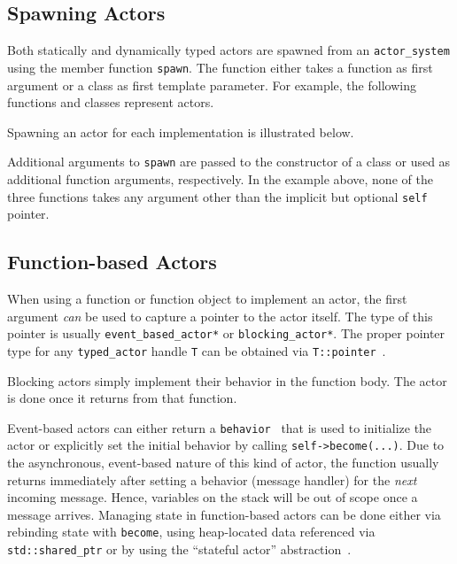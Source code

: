 \clearpage
\subsection{Spawning Actors}
\label{spawn}

Both statically and dynamically typed actors are spawned from an \lstinline^actor_system^ using the member function \lstinline^spawn^. The function either takes a function as first argument or a class as first template parameter. For example, the following functions and classes represent actors.



Spawning an actor for each implementation is illustrated below.



Additional arguments to \lstinline^spawn^ are passed to the constructor of a class or used as additional function arguments, respectively. In the example above, none of the three functions takes any argument other than the implicit but optional \lstinline^self^ pointer.

\subsection{Function-based Actors}
\label{function-based}

When using a function or function object to implement an actor, the first argument \emph{can} be used to capture a pointer to the actor itself.
The type of this pointer is usually \lstinline^event_based_actor*^ or \lstinline^blocking_actor*^.
The proper pointer type for any \lstinline^typed_actor^ handle \lstinline^T^ can be obtained via \lstinline^T::pointer^~.

Blocking actors simply implement their behavior in the function body. The actor is done once it returns from that function.

Event-based actors can either return a \lstinline^behavior^~ that is used to initialize the actor or explicitly set the initial behavior by calling \lstinline^self->become(...)^. Due to the asynchronous, event-based nature of this kind of actor, the function usually returns immediately after setting a behavior (message handler) for the \emph{next} incoming message. Hence, variables on the stack will be out of scope once a message arrives. Managing state in function-based actors can be done either via rebinding state with \lstinline^become^, using heap-located data referenced via \lstinline^std::shared_ptr^ or by using the ``stateful actor'' abstraction~.

